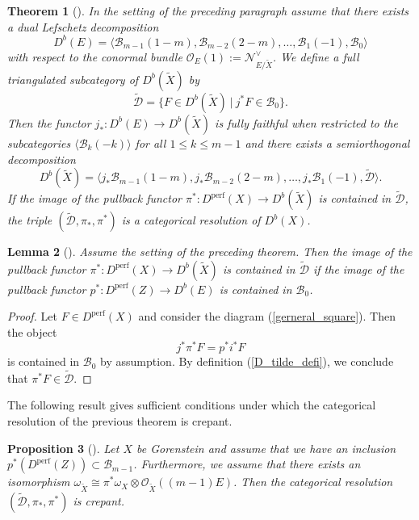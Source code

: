 \documentclass[a4paper, twoside, 11pt]{amsart}
\newtheorem{theorem}{Theorem}[section]
\newtheorem{lemma}[theorem]{Lemma}
\newtheorem{proposition}[theorem]{Proposition}
\theoremstyle{definition}
\theoremstyle{remark}
\numberwithin{equation}{theorem}
\DeclareMathOperator{\lilperf}{perf}
\newcommand{\dbx}{D^b(X)}
\begin{document}
\begin{theorem}[{\cite[Lemma 4.1, Theorem 4.4]{Lefschetz_Decomp}}]\label{LefschetzProp}\label{catres_withLefschetz}
    In the setting of the preceding paragraph assume that there exists a dual Lefschetz decomposition
	\begin{equation}\label{dual_Lefschetz}
		D^b(E) = \langle \mathcal{B}_{m-1}(1-m), \mathcal{B}_{m-2}(2-m),\dots, \mathcal{B}_1(-1), \mathcal{B}_0\rangle 
	\end{equation} 
	with respect to the conormal bundle $\mathcal{O}_E(1) := \mathcal{N}_{E/\widetilde{X}}^{\vee}$. We define a full triangulated subcategory of $D^b(\widetilde{X})$ by
	\begin{equation}\label{D_tilde_defi}
		\widetilde{\mathcal{D}} = \{F \in D^b(\widetilde{X}) \ | \ j^*F \in \mathcal{B}_0\}.
	\end{equation}
	Then the functor $j_*\colon D^b(E) \to D^b(\widetilde{X})$ is fully faithful when restricted to the subcategories $\langle \mathcal{B}_k(-k) \rangle$ for all $1 \leq k \leq m-1$ and there exists a semiorthogonal decomposition 
	\begin{equation*}
		D^b(\widetilde{X}) = \langle j_*\mathcal{B}_{m-1}(1-m), j_*\mathcal{B}_{m-2}(2-m), \dots, j_*\mathcal{B}_{1}(-1),\widetilde{\mathcal{D}}\rangle.
	\end{equation*}
    If the image of the pullback functor $\pi^*\colon D^{\lilperf}(X) \to D^b(\widetilde{X})$ is contained in $\widetilde{\mathcal{D}}$, the triple $(\widetilde{\mathcal{D}}, \pi_*, \pi^*)$ is a categorical resolution of $\dbx$. 
\end{theorem}
\begin{lemma}[{\cite[Lemma 4.3]{Lefschetz_Decomp}}]\label{small_to_big}
    Assume the setting of the preceding theorem. Then the image of the pullback functor $\pi^*\colon D^{\lilperf}(X) \to D^b(\widetilde{X})$ is contained in $\widetilde{\mathcal{D}}$ if the image of the pullback functor $p^*\colon D^{\lilperf}(Z) \to D^b(E)$ is contained in $\mathcal{B}_0$.
\end{lemma}
\begin{proof}
    Let $F\in D^{\lilperf}(X)$ and consider the diagram (\ref{gerneral_square}). Then the object
    \begin{equation*}
        j^*\pi^*F = p^*i^*F 
    \end{equation*}
    is contained in $\mathcal{B}_0$ by assumption. By definition (\ref{D_tilde_defi}),
    we conclude that $\pi^*F \in \widetilde{\mathcal{D}}$.
\end{proof}
The following result gives sufficient conditions under which the categorical resolution of the previous theorem is crepant. 
\begin{proposition}[{\cite[Proposition 4.5]{Lefschetz_Decomp}}]\label{crepancy_check}
	Let $X$ be Gorenstein and assume that we have an inclusion $p^*(D^{\lilperf}(Z)) \subset \mathcal{B}_{m-1}$. Furthermore, we assume that there exists an isomorphism $\omega_{\widetilde{X}} \cong \pi^*\omega_X \otimes \mathcal{O}_{\widetilde{X}}((m-1)E)$. Then the categorical resolution $(\widetilde{\mathcal{D}}, \pi_*,\pi^*)$ is crepant. 
\end{proposition}
\end{document}
